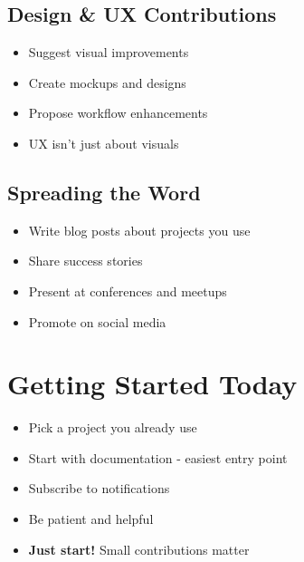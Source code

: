 \documentclass{presentacion}
\begin{document}
\subsection{Design \& UX Contributions}
\begin{frame}
    \begin{itemize}[<+->]
        \item Suggest visual improvements
        \item Create mockups and designs
        \item Propose workflow enhancements
        \item UX isn't just about visuals
    \end{itemize}
    
    \vspace{1em}
\end{frame}

\subsection{Spreading the Word}
\begin{frame}
    \begin{itemize}[<+->]
        \item Write blog posts about projects you use
        \item Share success stories
        \item Present at conferences and meetups
        \item Promote on social media
    \end{itemize}
    
    \vspace{1em}
\end{frame}

\section{Getting Started Today}

\begin{frame}
    \begin{itemize}[<+->]
        \item Pick a project you already use
        \item Start with documentation - easiest entry point
        \item Subscribe to notifications
        \item Be patient and helpful
        \item \textbf{Just start!} Small contributions matter
    \end{itemize}
    
    \vspace{2em}
\end{frame}
\end{document}

